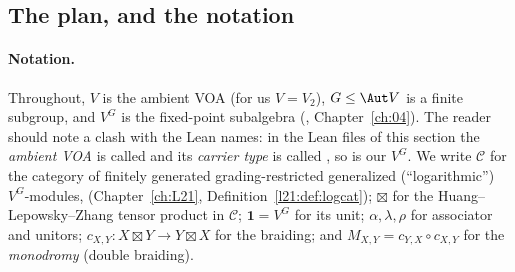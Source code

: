 \subsection{The plan, and the notation}\label{l22:sec:B3plan}

\paragraph{Notation.} Throughout, $V$ is the ambient VOA (for us $V=V_2$), $G\le\Aut V$ is a finite subgroup, and
$V^G$ is the fixed-point subalgebra (, Chapter~\ref{ch:04}). The reader should note a clash with
the Lean names: in the Lean files of this section the \emph{ambient VOA} is called  and its \emph{carrier type}
is called , so  is our $V^G$. We write $\mathcal C$ for the category of finitely generated
grading-restricted generalized (``logarithmic'') $V^G$-modules, 
(Chapter~\ref{ch:L21}, Definition~\ref{l21:def:logcat}); $\boxtimes$ for the Huang--Lepowsky--Zhang tensor product in
$\mathcal C$; $\mathbf 1=V^G$ for its unit; $\alpha,\lambda,\rho$ for associator and unitors; $c_{X,Y}:X\boxtimes Y\to
Y\boxtimes X$ for the braiding; and $M_{X,Y}=c_{Y,X}\circ c_{X,Y}$ for the \emph{monodromy} (double braiding).

